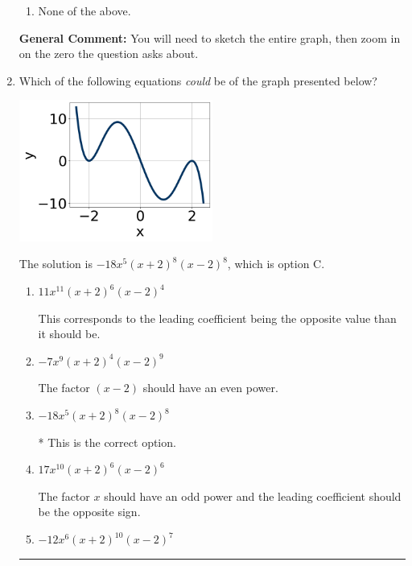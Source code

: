 \documentclass{extbook}[14pt]
\newcommand{\litem}[1]{\item #1

\rule{\textwidth}{0.4pt}}
\begin{document}
\begin{enumerate}
{\begin{enumerate}[label=\Alph*.]
\item None of the above.\end{enumerate}
\textbf{General Comment:} You will need to sketch the entire graph, then zoom in on the zero the question asks about.
}
\litem{
Which of the following equations \textit{could} be of the graph presented below?

\begin{center}
    \includegraphics[width=0.5\textwidth]{../Figures/polyGraphToFunctionC.png}
\end{center}


The solution is \( -18x^{5} (x + 2)^{8} (x - 2)^{8} \), which is option C.\begin{enumerate}[label=\Alph*.]
\item \( 11x^{11} (x + 2)^{6} (x - 2)^{4} \)

This corresponds to the leading coefficient being the opposite value than it should be.
\item \( -7x^{9} (x + 2)^{4} (x - 2)^{9} \)

The factor $(x - 2)$ should have an even power.
\item \( -18x^{5} (x + 2)^{8} (x - 2)^{8} \)

* This is the correct option.
\item \( 17x^{10} (x + 2)^{6} (x - 2)^{6} \)

The factor $x$ should have an odd power and the leading coefficient should be the opposite sign.
\item \( -12x^{6} (x + 2)^{10} (x - 2)^{7} \)


\end{enumerate}}
\end{enumerate}
\end{document}
